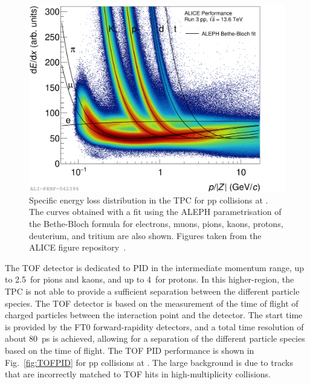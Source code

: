\begin{figure}[htb]
    \centering
    \includegraphics[width=0.7\linewidth]{Figures/Chapter 4/tpcdedx_1.png}
    \caption{Specific energy loss distribution \dedx in the TPC for pp collisions at \thirteen. The curves obtained with a fit using the ALEPH parametrisation of the Bethe-Bloch formula for electrons, muons, pions, kaons, protons, deuterium, and tritium are also shown. Figures taken from the ALICE figure repository~\cite{ALICE_figures}.}
    \label{fig:ITSTPCPID}
\end{figure}

The TOF detector is dedicated to PID in the intermediate momentum range, up to 2.5~\gevc for pions and kaons, and up to 4~\gevc for protons. In this higher-\pt region, the TPC is not able to provide a sufficient separation between the different particle species. The TOF detector is based on the measurement of the time of flight of charged particles between the interaction point and the detector. The start time is provided by the FT0 forward-rapidity detectors, and a total time resolution of about 80~ps is achieved, allowing for a separation of the different particle species based on the time of flight. The TOF PID performance is shown in Fig.~\ref{fig:TOFPID} for pp collisions at \thirteen. The large background is due to tracks that are incorrectly matched to TOF hits in high-multiplicity \pbpb collisions.

